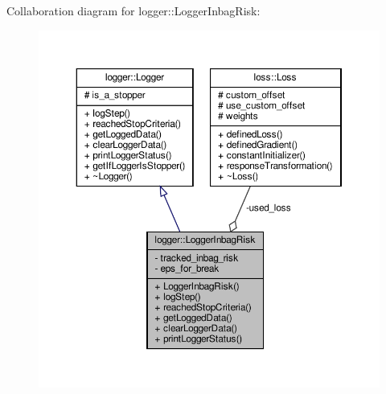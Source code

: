 Collaboration diagram for logger\+:\+:Logger\+Inbag\+Risk\+:
\nopagebreak
\begin{figure}[H]
\begin{center}
\leavevmode
\includegraphics[width=350pt]{classlogger_1_1_logger_inbag_risk__coll__graph}
\end{center}
\end{figure}
